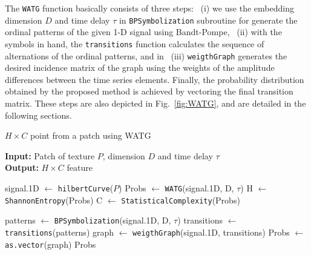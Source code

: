 \documentclass[journal]{IEEEtran}
\begin{document}
	The \texttt{WATG} function basically consists of three steps: ~(i) we use the embedding dimension $D$ and time delay $\tau$ in \texttt{BPSymbolization} subroutine for generate the ordinal patterns of the given 1-D signal using Bandt-Pompe, ~(ii) with the symbols in hand, the \texttt{transitions} function calculates the sequence of alternations of the ordinal patterns, and in ~(iii) \texttt{weigthGraph} generates the desired incidence matrix of the graph using the weights of the amplitude differences between the time series elements.
	Finally, the probability distribution obtained by the proposed method is achieved by vectoring the final transition matrix.
	These steps are also depicted in Fig.~\ref{fig:WATG}, and are detailed in the following sections.
	
	\begin{algorithm}[h]
		\caption{$H \times C$ point from a patch using WATG}
		\label{alg:watg}                                
		\textbf{Input:} Patch of texture $P$, dimension $D$ and time delay \textbf{$\tau$}\\
		\textbf{Output:} $H \times C$ feature
		\begin{algorithmic}[1]
			\State signal.1D $\gets$ \texttt{hilbertCurve}($P$)
			\State Probs $\gets$ \texttt{WATG}(signal.1D, D, $\tau$)
			\State H $\gets$ \texttt{ShannonEntropy}(Probs)
			\State C $\gets$ \texttt{StatisticalComplexity}(Probs)
			
			\vspace{0.15cm}
			
			\State patterns $\gets$ \texttt{BPSymbolization}(signal.1D, D, $\tau$)
			\State transitions $\gets$ \texttt{transitions}(patterns)
			\State graph $\gets$ \texttt{weigthGraph}(signal.1D, transitions)
			\State Probs $\gets$ \texttt{as.vector}(graph)
			\State \Return Probs
			\EndFunction
		\end{algorithmic}
	\end{algorithm}
	
\end{document}

